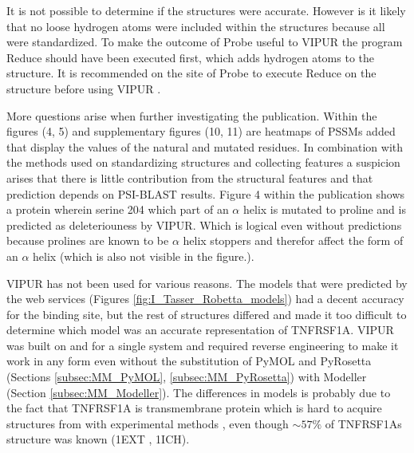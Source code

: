It is not possible to determine if the structures were accurate. However is it likely that no loose hydrogen atoms were included within the structures because all were standardized. To make the outcome of Probe useful to VIPUR the program Reduce should have been executed first, which adds hydrogen atoms to the structure. It is recommended on the site of Probe to execute Reduce on the structure before using VIPUR \cite{richardson_lab_probe_nodate}.

More questions arise when further investigating the publication. Within the figures (4, 5) \cite{baugh_robust_2016} and supplementary figures (10, 11) \cite{baugh_supplementary:_2016} are heatmaps of PSSMs added that display the values of the natural and mutated residues. In combination with the methods used on standardizing structures and collecting features a suspicion arises that there is little contribution from the structural features and that prediction depends on PSI-BLAST results. Figure 4 within the publication shows a protein wherein serine 204 which part of an $\alpha$ helix is mutated to proline and is predicted as deleteriouness by VIPUR. Which is logical even without predictions because prolines are known to be $\alpha$ helix stoppers \cite{li_alpha-helical_1996} and therefor affect the form of an $\alpha$ helix (which is also not visible in the figure.).

VIPUR has not been used for various reasons. The models that were predicted by the web services (Figures \ref{fig:I_Tasser_Robetta_models}) had a decent accuracy for the binding site, but the rest of structures differed and made it too difficult to determine which model was an accurate representation of TNFRSF1A. VIPUR was built on and for a single system and required reverse engineering to make it work in any form even without the substitution of PyMOL and PyRosetta  (Sections \ref{subsec:MM_PyMOL}, \ref{subsec:MM_PyRosetta}) with Modeller (Section \ref{subsec:MM_Modeller}).
The differences in models is probably due to the fact that TNFRSF1A is transmembrane protein which is hard to acquire structures from with experimental methods \cite{yonath_x-ray_2011}, even though $\sim57\%$ of TNFRSF1As structure was known (1EXT\cite{naismith_structures_1996} , 1ICH\cite{sukits_solution_2001}).

